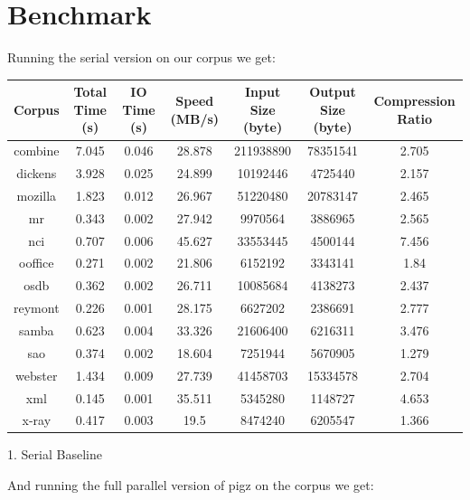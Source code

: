 \section{Benchmark}
Running the serial version on our corpus we get:\\
\begin{center}
\begin{tabular}{ |c|c|c|c|c|c|c| } 
 \hline
 Corpus & Total Time (s) & IO Time (s) & Speed (MB/s) & Input Size (byte) & Output Size (byte) & Compression Ratio\\
 \hline
combine & 7.045 & 0.046 & 28.878 & 211938890 & 78351541 & 2.705\\
\hline
dickens & 3.928 & 0.025 & 24.899 & 10192446 & 4725440 & 2.157\\
\hline
mozilla & 1.823 & 0.012 & 26.967 & 51220480 & 20783147 & 2.465\\
\hline
mr & 0.343 & 0.002 & 27.942 & 9970564 & 3886965 & 2.565\\
\hline
nci & 0.707 & 0.006 & 45.627 & 33553445 & 4500144 & 7.456\\
\hline
ooffice & 0.271 & 0.002 & 21.806 & 6152192 & 3343141 & 1.84\\
\hline
osdb & 0.362 & 0.002 & 26.711 & 10085684 & 4138273 & 2.437\\
\hline
reymont & 0.226 & 0.001 & 28.175 & 6627202 & 2386691 & 2.777\\
\hline
samba & 0.623 & 0.004 & 33.326 & 21606400 & 6216311 & 3.476\\
\hline
sao & 0.374 & 0.002 & 18.604 & 7251944 & 5670905 & 1.279\\
\hline
webster & 1.434 & 0.009 & 27.739 & 41458703 & 15334578 & 2.704\\
\hline
xml & 0.145 & 0.001 & 35.511 & 5345280 & 1148727 & 4.653\\
\hline
x-ray & 0.417 & 0.003 & 19.5 & 8474240 & 6205547 & 1.366\\
\hline
\end{tabular}
1. Serial Baseline
\end{center}

And running the full parallel version of pigz on the corpus we get:\\

